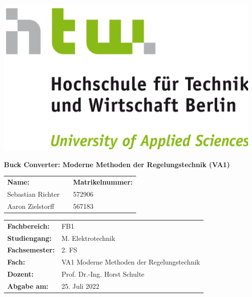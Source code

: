 \documentclass[
	pagesize,
	fontsize=12pt,
	paper=a4,
	oneside,
   reqno
]{scrartcl}
\begin{document}
\begin{titlepage}
   \pagestyle{empty} %

   \begin{flushright}
   \includegraphics[scale=.07]{Bilder/LogoHTWBerlin.png}  \nocite{HTWgross}
   \end{flushright}

   \vspace{1cm}

   \begin{center}
      \Huge{\textbf{Buck Converter: Moderne Methoden der Regelungstechnik (VA1)}} \\
   \end{center}

   \vspace{3cm}

   \begin{flushleft}
      \begin{tabular}{l c l }
         \textbf{Name: }&\hspace{1 cm} &\textbf{Matrikelnummer:} \\
         Sebastian Richter  & & 572906 \\
         Aaron Zielstorff   & & 567183 \\
      \end{tabular}
   \end{flushleft}

   \vspace{1cm}

   \begin{tabular}{l l}
      \textbf{Fachbereich:}   & FB1                                                 \\
      \textbf{Studiengang:}   & M.\xspace Elektrotechnik                            \\
      \textbf{Fachsemester:}  & 2.\xspace FS                                        \\
      \textbf{Fach:}          & VA1 Moderne Methoden der Regelungstechnik           \\
      \textbf{Dozent:}        & Prof.\xspace Dr.\xspace -Ing.\xspace Horst Schulte  \\
      \textbf{Abgabe am:}     & 25.\xspace Juli 2022                                \\ 
   \end{tabular}
\end{titlepage}
\end{document}
